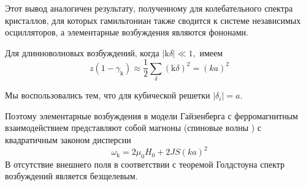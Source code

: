 \documentclass[a4paper,12pt]{article} %
\begin{document}
\begin{ttask}
Этот вывод аналогичен результату, 
полученному для колебательного спектра кристаллов, 
для которых гамильтониан также сводится к системе независимых осцилляторов, 
а элементарные возбуждения являются фононами.



Для длинноволновых возбуждений, когда $|\mathrm{k} \delta| \ll 1,$ имеем
$$
z\left(1-\gamma_{\mathrm{k}}\right) \approx \frac{1}{2} \sum_{\delta}(\mathrm{k} \delta)^{2}=(k a)^{2}
$$

Мы воспользовались тем, что для кубической решетки 
$\left|\delta_{i}\right|=a$. 


Поэтому элементарные возбуждения в модели Гайзенберга с ферромагнитным взаимодействием 
представляют собой магноны (спиновые волны ) с квадратичным законом дисперсии
$$
\omega_{\mathrm{k}}=2 \mu_{0} H_{0}+2 J S(k a)^{2}
$$
В отсутствие внешнего поля в соответствии с теоремой Голдстоуна 
спектр возбуждений является безщелевым.





















\end{ttask}
\end{document}
